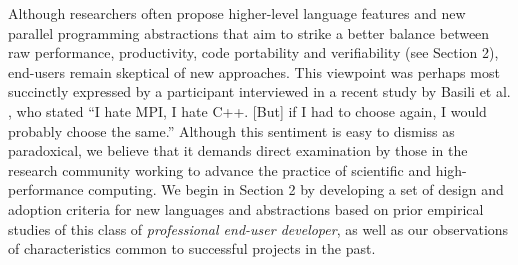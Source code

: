 \documentclass{llncs}
\begin{document}
Although researchers often propose higher-level language features and new parallel programming abstractions that aim to strike a better balance between raw performance, productivity, code portability and verifiability (see Section 2), end-users remain skeptical of new approaches. This viewpoint was perhaps most succinctly expressed by a participant interviewed in a recent study by Basili et al. \cite{basili2008understanding}, who stated ``I hate MPI, I hate C++. [But] if I had to choose again, I would probably choose the same.'' Although this sentiment is easy to dismiss as paradoxical, we believe that it demands direct examination by those in the research community working to advance the practice of scientific and high-performance computing. We begin in Section 2 by developing a set of design and adoption criteria for new languages and abstractions based on prior empirical studies of this class of {\it professional end-user developer}, as well as our observations of characteristics common to successful projects in the past. 

%
% 

\end{document}
